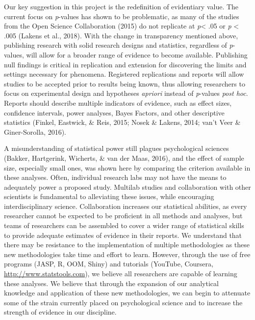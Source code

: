 \documentclass[english,mask,man]{apa6}
\theoremstyle{definition}
\theoremstyle{definition}
\theoremstyle{definition}
\theoremstyle{remark}
\begin{document}
Our key suggestion in this project is the redefinition of evidentiary
value. The current focus on \emph{p}-values has shown to be problematic,
as many of the studies from the Open Science Collaboration (2015) do not
replicate at \emph{p}\textless{} .05 or \emph{p} \textless{} .005
(Lakens et al., 2018). With the change in transparency mentioned above,
publishing research with solid research designs and statistics,
regardless of \emph{p}-values, will allow for a broader range of
evidence to become available. Publishing null findings is critical in
replication and extension for discovering the limits and settings
necessary for phenomena. Registered replications and reports will allow
studies to be accepted prior to results being known, thus allowing
researchers to focus on experimental design and hypotheses
\emph{apriori} instead of \emph{p}-values \emph{post hoc}. Reports
should describe multiple indicators of evidence, such as effect sizes,
confidence intervals, power analyses, Bayes Factors, and other
descriptive statistics (Finkel, Eastwick, \& Reis, 2015; Nosek \&
Lakens, 2014; van't Veer \& Giner-Sorolla, 2016).

A misunderstanding of statistical power still plagues psychological
sciences (Bakker, Hartgerink, Wicherts, \& van der Maas, 2016), and the
effect of sample size, especially small ones, was shown here by
comparing the criterion available in these analyses. Often, individual
research labs may not have the means to adequately power a proposed
study. Multilab studies and collaboration with other scientists is
fundamental to alleviating these issues, while encouraging
interdisciplinary science. Collaboration increases our statistical
abilities, as every researcher cannot be expected to be proficient in
all methods and analyses, but teams of researchers can be assembled to
cover a wider range of statistical skills to provide adequate estimates
of evidence in their reports. We understand that there may be resistance
to the implementation of multiple methodologies as these new
methodologies take time and effort to learn. However, through the use of
free programs (JASP, R, OOM, Shiny) and tutorials (YouTube, Coursera,
\url{http://www.statstools.com}), we believe all researchers are capable
of learning these analyses. We believe that through the expansion of our
analytical knowledge and application of these new methodologies, we can
begin to attenuate some of the strain currently placed on psychological
science and to increase the strength of evidence in our discipline.
\end{document}
